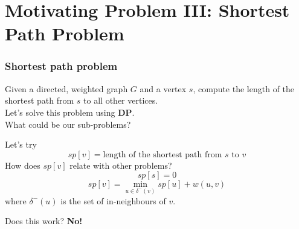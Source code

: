 \documentclass[12pt]{beamer}
\newcommand{\blank}{\vspace{.5cm}}
\begin{document}
\section{Motivating Problem III: Shortest Path Problem}

\begin{frame}
    \frametitle{Shortest path problem}
    Given a directed, weighted graph $G$ and a vertex $s$, compute the length of the shortest path from $s$ to all other vertices. \\\blank
    Let's solve this problem using \textbf{DP}. \\\blank
    What could be our sub-problems?
\end{frame}

\begin{frame}
    Let's try
    \[
        sp[v] = \text{length of the shortest path from $s$ to $v$}
    \]
    \blank
    How does $sp[v]$ relate with other problems? \pause
    \[ 
        sp[s] = 0
    \]
    \[
        sp[v] = \min_{u \in \delta^-(v)} sp[u] + w(u, v)
    \]
    where $\delta^-(u)$ is the set of in-neighbours of $v$.

    \begin{center}
    \end{center}

    Does this work? \textbf{No!} \pause \\


\end{frame}
\end{document}
